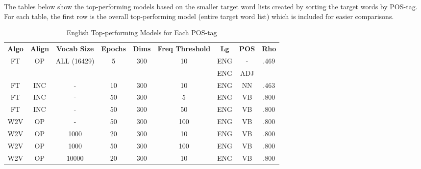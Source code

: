 The tables below show the top-performing models based on the smaller target word lists created by sorting the target words by POS-tag. For each table, the first row is the overall top-performing model (entire target word list) which is included for easier comparisons. 

\begin{table}[h]
\centering
\begin{tabular}{ccccccccc} 
\toprule
\textbf{ Algo } & \textbf{ Align } & \textbf{ Vocab Size } & \textbf{ Epochs } & \textbf{ Dims } & \textbf{ Freq Threshold } & \textbf{ Lg } & \textbf{ POS } & \textbf{ Rho }  \\
FT              & OP               & ALL (16429)           & 5                 & 300             & 10                        & ENG           & -              & .469            \\
-               & -                & -                     & -                 & -               & -                         & ENG           & ADJ            & -               \\
FT              & INC              & -                     & 10                & 300             & 10                        & ENG           & NN             & .463            \\
FT              & INC              & -                     & 50                & 300             & 5                         & ENG           & VB             & .800            \\
FT              & INC              & -                     & 50                & 300             & 50                        & ENG           & VB             & .800            \\
W2V             & OP               & -                     & 50                & 300             & 100                       & ENG           & VB             & .800            \\
W2V             & OP               & 1000                  & 20                & 300             & 10                        & ENG           & VB             & .800            \\
W2V             & OP               & 1000                  & 50                & 300             & 100                       & ENG           & VB             & .800            \\
W2V             & OP               & 10000                 & 20                & 300             & 10                        & ENG           & VB             & .800            \\
\bottomrule
\end{tabular}
\caption{English Top-performing Models for Each POS-tag}
\label{tab:eng-posresults}
\end{table}


